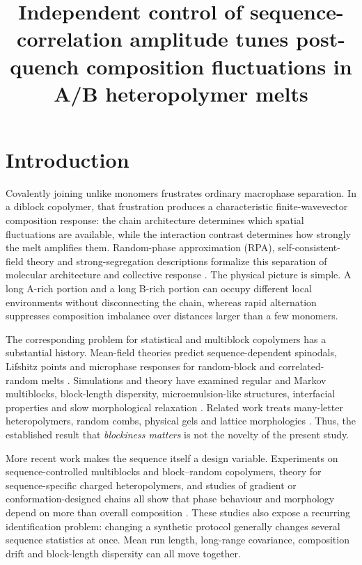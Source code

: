 \documentclass[pdflatex,sn-nature,onecolumn]{sn-jnl}
\title[Independent control of sequence-correlation amplitude]{Independent control of sequence-correlation amplitude tunes post-quench composition fluctuations in A/B heteropolymer melts}
\author*{\fnm{Alexander Okezue} \sur{Bell}}\email{okezue@stanford.edu}
\affil{\orgname{Stanford University}, \orgaddress{\street{450 Jane Stanford Way}, \city{Stanford}, \state{CA}, \postcode{94305}, \country{USA}}}
\begin{document}
\maketitle
\raggedright
\raggedbottom
\pagestyle{plain}
\thispagestyle{plain}

\section{Introduction}

Covalently joining unlike monomers frustrates ordinary macrophase separation. In a diblock copolymer, that frustration produces a characteristic finite-wavevector composition response: the chain architecture determines which spatial fluctuations are available, while the interaction contrast determines how strongly the melt amplifies them. Random-phase approximation (RPA), self-consistent-field theory and strong-segregation descriptions formalize this separation of molecular architecture and collective response \cite{Leibler1980,FredricksonHelfand1987,MatsenBates1996,BatesFredrickson1999}. The physical picture is simple. A long A-rich portion and a long B-rich portion can occupy different local environments without disconnecting the chain, whereas rapid alternation suppresses composition imbalance over distances larger than a few monomers.

The corresponding problem for statistical and multiblock copolymers has a substantial history. Mean-field theories predict sequence-dependent spinodals, Lifshitz points and microphase responses for random-block and correlated-random melts \cite{FredricksonMilnerLeibler1992,Angerman1996,MaoSpakowitz2016,Patyukova2021}. Simulations and theory have examined regular and Markov multiblocks, block-length dispersity, microemulsion-like structures, interfacial properties and slow morphological relaxation \cite{Gavrilov2011CPL,Gavrilov2011PSA,Govorun2017,Rudyak2022,Steinmuller2012Morph,Steinmuller2012Bulk}. Related work treats many-letter heteropolymers, random combs, physical gels and lattice morphologies \cite{Sfatos1994,Foster1995,Glotzer1993,Dotera1999}. Thus, the established result that \emph{blockiness matters} is not the novelty of the present study.

More recent work makes the sequence itself a design variable. Experiments on sequence-controlled multiblocks and block--random copolymers, theory for sequence-specific charged heteropolymers, and studies of gradient or conformation-designed chains all show that phase behaviour and morphology depend on more than overall composition \cite{Zhang2017,Taylor2024,LiMuthukumar2022,Ganesan2012,Govorun2015,Govorun2021}. These studies also expose a recurring identification problem: changing a synthetic protocol generally changes several sequence statistics at once. Mean run length, long-range covariance, composition drift and block-length dispersity can all move together.
\end{document}
